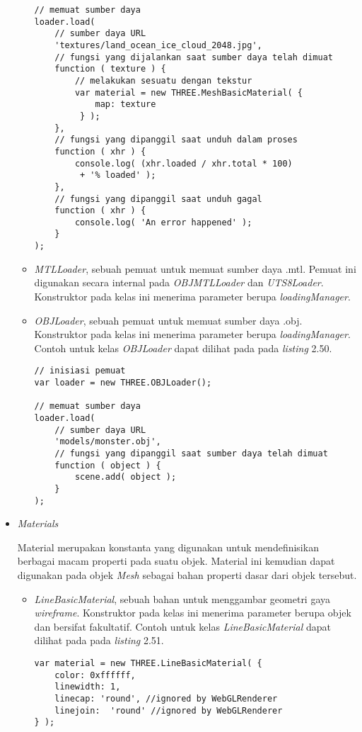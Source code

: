 \begin{itemize}
\begin{itemize}
\begin{lstlisting}[caption={Contoh penggunaan kelas {\it TextureLoader}.},captionpos=b]
// memuat sumber daya
loader.load(
	// sumber daya URL
	'textures/land_ocean_ice_cloud_2048.jpg',
	// fungsi yang dijalankan saat sumber daya telah dimuat
	function ( texture ) {
		// melakukan sesuatu dengan tekstur
		var material = new THREE.MeshBasicMaterial( {
			map: texture
		 } );
	},
	// fungsi yang dipanggil saat unduh dalam proses
	function ( xhr ) {
		console.log( (xhr.loaded / xhr.total * 100)
		 + '% loaded' );
	},
	// fungsi yang dipanggil saat unduh gagal
	function ( xhr ) {
		console.log( 'An error happened' );
	}
);
\end{lstlisting}

	\item {\it MTLLoader}, sebuah pemuat untuk memuat sumber daya .mtl. Pemuat ini digunakan secara internal pada {\it OBJMTLLoader} dan {\it UTS8Loader}. Konstruktor pada kelas ini menerima parameter berupa  {\it loadingManager}.
	
	\item {\it OBJLoader}, sebuah pemuat untuk memuat sumber daya .obj. Konstruktor pada kelas ini menerima parameter berupa  {\it loadingManager}. Contoh untuk kelas {\it OBJLoader} dapat dilihat pada pada {\it listing} 2.50.
	
\begin{lstlisting}[caption={Contoh penggunaan kelas {\it OBJLoader}.},captionpos=b]
// inisiasi pemuat
var loader = new THREE.OBJLoader();

// memuat sumber daya
loader.load(
	// sumber daya URL
	'models/monster.obj',
	// fungsi yang dipanggil saat sumber daya telah dimuat
	function ( object ) {
		scene.add( object );
	}
);
\end{lstlisting}
	\end{itemize}

\item \textit{Materials}

Material merupakan konstanta yang digunakan untuk mendefinisikan berbagai macam properti pada suatu objek. Material ini kemudian dapat digunakan pada objek {\it Mesh} sebagai bahan properti dasar dari objek tersebut.
	\begin{itemize}
	\item {\it LineBasicMaterial}, sebuah bahan untuk menggambar geometri gaya {\it wireframe}. Konstruktor pada kelas ini menerima parameter berupa objek dan bersifat fakultatif. Contoh untuk kelas {\it LineBasicMaterial} dapat dilihat pada pada {\it listing} 2.51.
	
\begin{lstlisting}[caption={Contoh penggunaan kelas {\it LineBasicMaterial}.},captionpos=b]
var material = new THREE.LineBasicMaterial( {
	color: 0xffffff,
	linewidth: 1,
	linecap: 'round', //ignored by WebGLRenderer
	linejoin:  'round' //ignored by WebGLRenderer
} );
\end{lstlisting}


\end{itemize}
\end{itemize}
